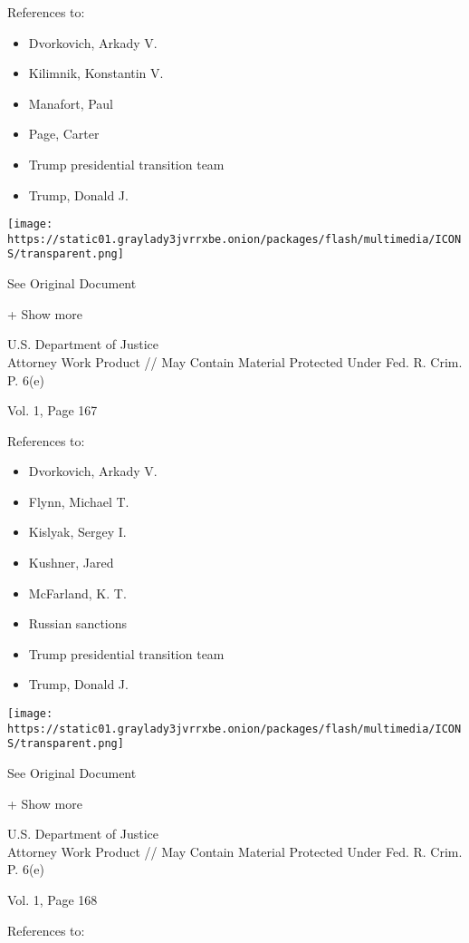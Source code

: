 References to:

\begin{itemize}
\tightlist
\item
  Dvorkovich, Arkady V.
\item
  Kilimnik, Konstantin V.
\item
  Manafort, Paul 
\item
  Page, Carter
\item
  Trump presidential transition team
\item
  Trump, Donald J.
\end{itemize}

\protect\hyperlink{}{}

\texttt{[image: https://static01.graylady3jvrrxbe.onion/packages/flash/multimedia/ICONS/transparent.png]}

See Original Document

+ Show more

U.S. Department of Justice\\
Attorney Work Product // May Contain Material Protected Under Fed. R.
Crim. P. 6(e)

Vol. 1, Page 167

References to:

\begin{itemize}
\tightlist
\item
  Dvorkovich, Arkady V.
\item
  Flynn, Michael T.
\item
  Kislyak, Sergey I.
\item
  Kushner, Jared
\item
  McFarland, K. T.
\item
  Russian sanctions
\item
  Trump presidential transition team
\item
  Trump, Donald J.
\end{itemize}

\protect\hyperlink{}{}

\texttt{[image: https://static01.graylady3jvrrxbe.onion/packages/flash/multimedia/ICONS/transparent.png]}

See Original Document

+ Show more

U.S. Department of Justice\\
Attorney Work Product // May Contain Material Protected Under Fed. R.
Crim. P. 6(e)

Vol. 1, Page 168

References to:

